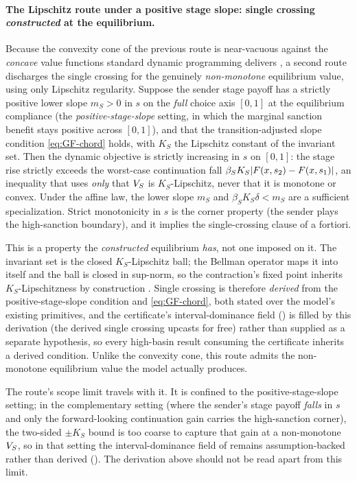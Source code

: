 \paragraph{The Lipschitz route under a positive stage slope: single crossing
\emph{constructed} at the equilibrium.} Because the convexity cone of
the previous route is near-vacuous against the \emph{concave} value
functions standard dynamic programming delivers
\citep[Thm~4.8]{StokeyLucas1989}, a second
route discharges the single crossing for the genuinely \emph{non-monotone}
equilibrium value, using only Lipschitz regularity. Suppose the sender
stage payoff has a strictly positive lower slope $m_S>0$ in $s$ on the
\emph{full} choice axis $[0,1]$ at the equilibrium compliance (the
\emph{positive-stage-slope} setting, in which the marginal sanction benefit stays
positive across $[0,1]$), and that the transition-adjusted slope condition
\eqref{eq:GF-chord} holds, with $K_S$ the Lipschitz constant of the invariant set.
Then the dynamic objective is strictly increasing in $s$ on $[0,1]$: the
stage rise strictly exceeds the worst-case continuation fall
$\beta_S K_S|F(x,s_2)-F(x,s_1)|$, an inequality that uses
\emph{only} that $V_S$ is $K_S$-Lipschitz, never that it is monotone or
convex. Under the affine law, the lower slope $m_S$ and
$\beta_S K_S\delta<m_S$ are a sufficient specialization. Strict
monotonicity in $s$ is the corner property (the sender plays the
high-sanction boundary), and it implies the single-crossing clause of
 a fortiori.

This is a property the \emph{constructed} equilibrium
\emph{has}, not one imposed on it. The invariant set is the closed
$K_S$-Lipschitz ball; the Bellman operator maps it into itself and the
ball is closed in sup-norm, so the contraction's fixed point inherits
$K_S$-Lipschitzness by construction
\citep[Cor.~1 to Thm~3.2]{StokeyLucas1989}. Single crossing is therefore
\emph{derived} from the positive-stage-slope condition and \eqref{eq:GF-chord},
both stated over the model's existing primitives, and the certificate's
interval-dominance field () is filled by this derivation
(the derived single crossing upcasts for free) rather than supplied as
a separate hypothesis, so every high-basin result consuming the
certificate inherits a derived condition. Unlike the convexity cone,
this route admits the non-monotone equilibrium value the model actually
produces.

The route's scope limit travels with it. It is confined to the
positive-stage-slope setting; in the complementary
setting (where the sender's stage payoff \emph{falls} in $s$ and
only the forward-looking continuation gain carries the high-sanction
corner), the two-sided $\pm K_S$ bound is too coarse to capture that
gain at a non-monotone $V_S$, so in that setting the
interval-dominance field of  remains assumption-backed
rather than derived (). The derivation above should not
be read apart from this limit.

